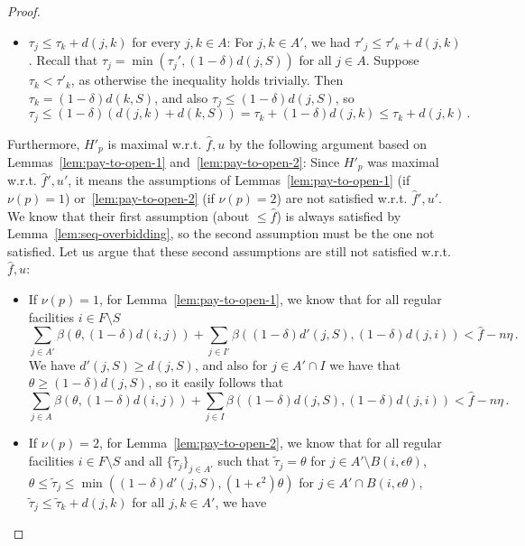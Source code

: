 \begin{proof}
\begin{itemize}
    Because $i_0$ is a regular facility, we also have $d'(i_0, j) = d(i_0, j)$.
    Also, for $j \in A' \cap I$, because $j \in I$ implies that $\tau_j' \geq \theta \geq (1-\delta)d(j, S)$, we have $\beta(\tau'_j, d(i_0, j)) \geq \beta((1-\delta) d(j,S), d(i_0, j))$, so we also have
    \[
    \sum_{j \in A} \beta(\tau_j, d(i_0,j)) + \sum_{j \in I} \beta((1-\delta)d(j,S), d(i_0,j))
    \leq \hat f.
    \]
    \item $\tau_j \leq \tau_k + d(j, k)$ for every $j, k \in A$: For $j, k \in A'$, we had $\tau'_j \leq \tau'_k + d(j,k)$.
    Recall that $\tau_j = \min(\tau_j', (1-\delta)d(j,S))$ for all $j \in A$.
    Suppose $\tau_k < \tau'_k$, as otherwise the inequality holds trivially.
    Then $\tau_k = (1-\delta) d(k, S)$, and also $\tau_j \leq (1-\delta) d(j, S)$, so
    \[\tau_j \leq (1-\delta) (d(j, k) + d(k, S)) = \tau_k + (1-\delta) d(j, k) \leq \tau_k + d(j, k)\,.\]
\end{itemize}
Furthermore, $H'_p$ is maximal w.r.t. $\hat f, u$ by the following argument based on Lemmas~\ref{lem:pay-to-open-1} and~\ref{lem:pay-to-open-2}: Since $H'_p$ was maximal w.r.t. $\hat f', u'$, it means the assumptions of Lemmas~\ref{lem:pay-to-open-1} (if $\nu(p)=1$) or~\ref{lem:pay-to-open-2} (if $\nu(p)=2$) are not satisfied w.r.t. $\hat f', u'$.
We know that their first assumption (about $\leq \hat{f}$) is always satisfied by Lemma~\ref{lem:seq-overbidding}, so the second assumption must be the one not satisfied.
Let us argue that these second assumptions are still not satisfied w.r.t. $\hat f, u$:
\begin{itemize}
    \item If $\nu(p)=1$, for Lemma~\ref{lem:pay-to-open-1}, we know that for all regular facilities $i \in F \setminus S$
    \[\sum_{j \in A'} \beta(\theta, (1-\delta)d(i,j)) + \sum_{j \in I'} \beta((1-\delta)d'(j, S), (1-\delta)d(j,i)) < \hat{f} - n \eta\,.\]
    We have $d'(j, S) \geq d(j, S)$, and also for $j \in A' \cap I$ we have that $\theta \geq (1-\delta) d(j, S)$, so it easily follows that 
    \[\sum_{j \in A} \beta(\theta, (1-\delta)d(i,j)) + \sum_{j \in I} \beta((1-\delta)d(j, S), (1-\delta)d(j,i)) < \hat{f} - n \eta\,.\]
    \item If $\nu(p)=2$, for Lemma~\ref{lem:pay-to-open-2}, we know that for all regular facilities $i \in F \setminus S$ and all $\{\tilde{\tau}_j\}_{j \in A'}$ such that $\tilde{\tau}_j = \theta$ for $j \in A' \setminus B(i, \epsilon \theta)$, $\theta \leq \tilde{\tau}_j \leq \min((1-\delta)d'(j,S), (1+\epsilon^2)\theta)$ for $j \in A' \cap B(i, \epsilon \theta)$, $\tilde{\tau}_j \leq \tilde{\tau}_k + d(j, k)$ for all $j, k \in A'$, we have

\end{itemize}
\end{proof}
